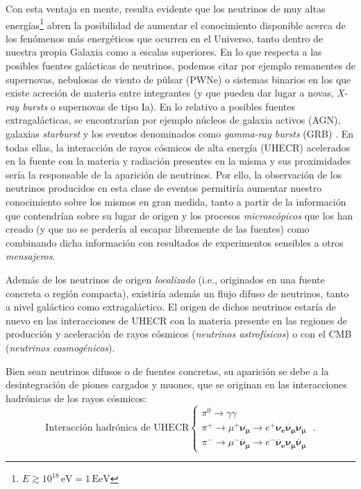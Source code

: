 \documentclass[11 pt, a4paper]{article} %
\numberwithin{equation}{section}
\numberwithin{figure}{section}
\numberwithin{table}{section}
\begin{document}
	Con esta ventaja en mente, resulta evidente que los neutrinos de muy altas energías\footnote{ $E\gtrsim 10^{18}\,\mathrm{eV}=1\,\mathrm{EeV}$} abren la posibilidad de aumentar el conocimiento disponible acerca de los fenómenos más energéticos que ocurren en el Universo, tanto dentro de nuestra propia Galaxia como a escalas superiores. En lo que respecta a las posibles fuentes galácticas de neutrinos, podemos citar por ejemplo remanentes de supernovas, nebulosas de viento de púlsar (PWNe) o sistemas binarios en los que existe acreción de materia entre integrantes (y que pueden dar lugar a novas, \textit{X-ray bursts} o supernovas de tipo Ia). En lo relativo a posibles fuentes extragalácticas, se encontrarían por ejemplo núcleos de galaxia activos (AGN), galaxias \textit{starburst} y los eventos denominados como \textit{gamma-ray bursts} (GRB) \cite{gaisser2018neutrino, gaisser2016cosmic, gaisser1995particle}. En todas ellas, la interacción de rayos cósmicos de alta energía (UHECR) acelerados en la fuente con la materia y radiación presentes en la misma y sus proximidades sería la responsable de la aparición de neutrinos. Por ello, la observación de los neutrinos producidos en esta clase de eventos permitiría aumentar nuestro conocimiento sobre los mismos en gran medida, tanto a partir de la información que contendrían sobre su lugar de origen y los procesos \textit{microscópicos} que los han creado (y que no se perdería al escapar libremente de las fuentes) como combinando dicha información con resultados de experimentos sensibles a otros \textit{mensajeros}.
	
	Además de los neutrinos de origen \textit{localizado} (i.e., originados en una fuente concreta o región compacta), existiría además un flujo difuso de neutrinos, tanto a nivel galáctico como extragaláctico. El origen de dichos neutrinos estaría de nuevo en las interacciones de UHECR con la materia presente en las regiones de producción y aceleración de rayos cósmicos (\textit{neutrinos astrofísicos}) o con el CMB (\textit{neutrinos cosmogénicos}). 
	
	Bien sean neutrinos difusos o de fuentes concretas, su aparición se debe a la desintegración de piones cargados y muones, que se originan en las interacciones hadrónicas de los rayos cósmicos:
	\begin{equation}
		\text{Interacción hadrónica de UHECR}\left\{\begin{array}{l}\pi^0\rightarrow \gamma\gamma\\\pi^+\rightarrow \mu^+ \bm{\nu_\mu}\rightarrow e^+ \bm{\nu_e \overline{\nu}_\mu \nu_\mu}\\ \pi^-\rightarrow \mu^- \bm{\overline{\nu}_\mu}\rightarrow e^- \bm{\overline{\nu}_e \nu_\mu \overline{\nu}_\mu}\end{array}\right.\;.\label{ec11}
	\end{equation}
	
\end{document}
